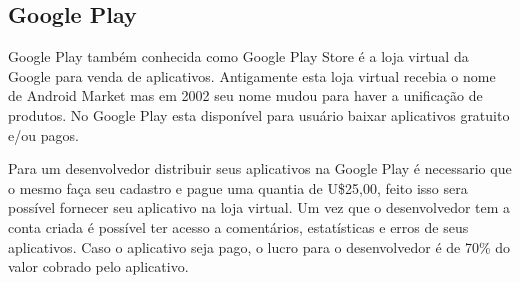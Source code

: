 	\begin{figure}[h!]
		\centering
	\end{figure}

\subsection{Google Play }

Google Play também conhecida como Google Play Store é a loja virtual da Google para venda de aplicativos. Antigamente esta loja virtual recebia o nome de Android Market mas em 2002 seu nome mudou para haver a unificação de produtos.
No Google Play esta disponível para usuário baixar aplicativos gratuito e/ou pagos.

Para um desenvolvedor distribuir seus aplicativos na Google Play é necessario que o mesmo faça seu cadastro e pague uma quantia de U\$25,00, feito isso
sera possível fornecer seu aplicativo na loja virtual.
Um vez que o desenvolvedor tem a conta criada é possível ter acesso a comentários, estatísticas e erros de seus aplicativos. Caso o aplicativo seja pago, o lucro para o desenvolvedor é de 70\% do valor cobrado pelo aplicativo.

